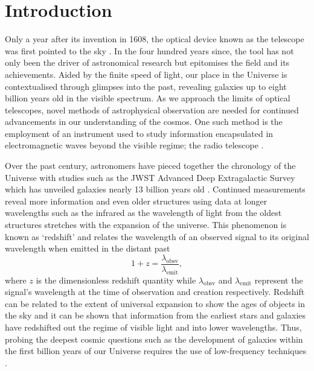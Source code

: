 
\chapter{Introduction}

\ifpdf
    \graphicspath{{introduction/figs/Raster/}{introduction/figs/PDF/}{introduction/figs/}}
\else
    \graphicspath{{introduction/figs/Vector/}{introduction/figs/}}
\fi


Only a year after its invention in 1608, the optical device known as the telescope was first pointed to the sky \citep{histTel}. In the four hundred years since, the tool has not only been the driver of astronomical research but epitomises the field and its achievements. Aided by the finite speed of light, our place in the Universe is contextualised through glimpses into the past, revealing galaxies up to eight billion years old in the visible spectrum. As we approach the limits of optical telescopes, novel methods of astrophysical observation are needed for continued advancements in our understanding of the cosmos. One such method is the employment of an instrument used to study information encapsulated in electromagnetic waves beyond the visible regime; the radio telescope \citep{smithObsAst}.

Over the past century, astronomers have pieced together the chronology of the Universe with studies such as the JWST Advanced Deep Extragalactic Survey which has unveiled galaxies nearly 13 billion years old \citep{jades}. Continued measurements reveal more information and even older structures using data at longer wavelengths such as the infrared \citep{abyss} as the wavelength of light from the oldest structures stretches with the expansion of the universe. This phenomenon is known as ‘redshift’ and relates the wavelength of an observed signal to its original wavelength when emitted in the distant past
\begin{equation}
    \label{eqn:redshift}
    1 + z = \frac{ \lambda_{\mathrm{obsv}} }{ \lambda_{\mathrm{emit}} },
\end{equation}
where $z$ is the dimensionless redshift quantity while $\lambda_{\mathrm{obsv}}$ and $\lambda_{\mathrm{emit}}$ represent the signal's wavelength at the time of observation and creation respectively. Redshift can be related to the extent of universal expansion to show the ages of objects in the sky and it can be shown that information from the earliest stars and galaxies have redshifted out the regime of visible light and into lower wavelengths. Thus, probing the deepest cosmic questions such as the development of galaxies within the first billion years of our Universe requires the use of low-frequency techniques \cite{furPhys}.

